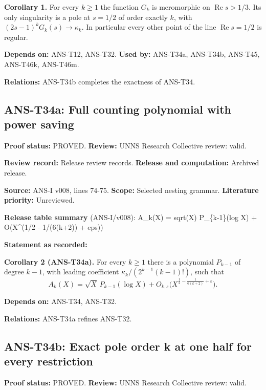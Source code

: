 \documentclass[
  11pt,
]{article}
\begin{document}
\textbf{Corollary 1.} For every \(k\ge1\) the function \(G_k\) is
meromorphic on \(\operatorname{Re}s>1/3\). Its only singularity is a
pole at \(s=1/2\) of order exactly \(k\), with
\((2s-1)^kG_k(s)\to\kappa_k\). In particular every other point of the
line \(\operatorname{Re}s=1/2\) is regular.

\textbf{Depends on:} ANS-T12, ANS-T32. \textbf{Used by:} ANS-T34a,
ANS-T34b, ANS-T45, ANS-T46k, ANS-T46m.

\textbf{Relations:} ANS-T34b completes the exactness of ANS-T34.

\hypertarget{ans-t34a-full-counting-polynomial-with-power-saving}{%
\subsection{ANS-T34a: Full counting polynomial with power
saving}\label{ans-t34a-full-counting-polynomial-with-power-saving}}

\textbf{Proof status:} PROVED. \textbf{Review:} UNNS Research Collective
review: valid.

\textbf{Review record:} Release review records. \textbf{Release and
computation:} Archived release.

\textbf{Source:} ANS-I v008, lines 74-75. \textbf{Scope:} Selected
nesting grammar. \textbf{Literature priority:} Unreviewed.

\textbf{Release table summary} (ANS-I/v008): A\_k(X) = sqrt(X)
P\_\{k-1\}(log X) + O(X\^{}(1/2 - 1/(6(k+2)) + eps))

\textbf{Statement as recorded:}

\textbf{Corollary 2 (ANS-T34a).} For every \(k\ge1\) there is a
polynomial \(P_{k-1}\) of degree \(k-1\), with leading coefficient
\(\kappa_k/(2^{k-1}(k-1)!)\), such that
\[A_k(X)=\sqrt X\,P_{k-1}(\log X)+O_{k,\varepsilon}\Big(X^{\frac12-\frac1{6(k+2)}+\varepsilon}\Big).\]

\textbf{Depends on:} ANS-T34, ANS-T32.

\textbf{Relations:} ANS-T34a refines ANS-T32.

\hypertarget{ans-t34b-exact-pole-order-k-at-one-half-for-every-restriction}{%
\subsection{ANS-T34b: Exact pole order k at one half for every
restriction}\label{ans-t34b-exact-pole-order-k-at-one-half-for-every-restriction}}

\textbf{Proof status:} PROVED. \textbf{Review:} UNNS Research Collective
review: valid.
\end{document}
